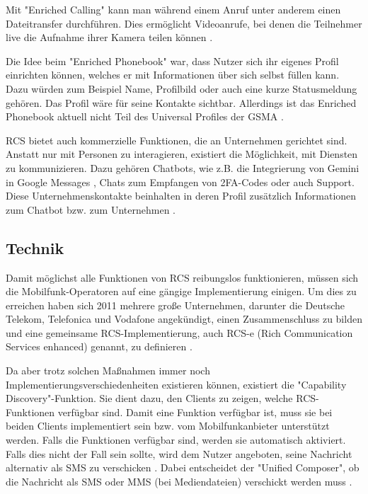 \documentclass[conference]{IEEEtran}
\begin{document}
Mit "Enriched Calling" kann man während einem Anruf unter anderem einen Dateitransfer durchführen.
Dies ermöglicht Videoanrufe, bei denen die Teilnehmer live die Aufnahme ihrer Kamera teilen können \cite{uniprof}.

Die Idee beim "Enriched Phonebook" war, dass Nutzer sich ihr eigenes Profil einrichten können, welches er mit Informationen über sich selbst füllen kann.
Dazu würden zum Beispiel Name, Profilbild oder auch eine kurze Statusmeldung gehören.
Das Profil wäre für seine Kontakte sichtbar.
Allerdings ist das Enriched Phonebook aktuell nicht Teil des Universal Profiles der GSMA \cite{rcsuite,uniprof}.

RCS bietet auch kommerzielle Funktionen, die an Unternehmen gerichtet sind.
Anstatt nur mit Personen zu interagieren, existiert die Möglichkeit, mit Diensten zu kommunizieren. Dazu gehören Chatbots, wie z.B. die Integrierung von Gemini in Google Messages \cite{geminiinteg}, Chats zum Empfangen von 2FA-Codes oder auch Support. Diese Unternehmenskontakte beinhalten in deren Profil zusätzlich Informationen zum Chatbot bzw. zum Unternehmen \cite{uniprof}.


\subsection{Technik}

Damit möglichst alle Funktionen von RCS reibungslos funktionieren, müssen sich die Mobilfunk-Operatoren auf eine gängige Implementierung einigen.
Um dies zu erreichen haben sich 2011 mehrere große Unternehmen, darunter die Deutsche Telekom, Telefonica und Vodafone angekündigt, einen Zusammenschluss zu bilden und eine gemeinsame RCS-Implementierung, auch RCS-e (Rich Communication Services enhanced) genannt, zu definieren \cite{rcsmno}.

Da aber trotz solchen Maßnahmen immer noch Implementierungsverschiedenheiten existieren können, existiert die "Capability Discovery"-Funktion.
Sie dient dazu, den Clients zu zeigen, welche RCS-Funktionen verfügbar sind.
Damit eine Funktion verfügbar ist, muss sie bei beiden Clients implementiert sein bzw. vom Mobilfunkanbieter unterstützt werden.
Falls die Funktionen verfügbar sind, werden sie automatisch aktiviert.
Falls dies nicht der Fall sein sollte, wird dem Nutzer angeboten, seine Nachricht alternativ als SMS zu verschicken \cite{uniprof}.
Dabei entscheidet der "Unified Composer", ob die Nachricht als SMS oder MMS (bei Mediendateien) verschickt werden muss \cite{rcsuite}.
\end{document}

